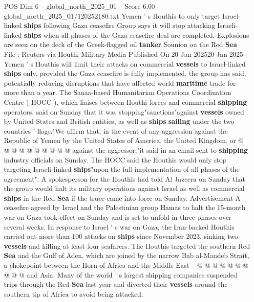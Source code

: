 \begin{textsample}{POS Dim 6 – global\_north\_2025\_01 – Score 6.00 – global\_north\_2025\_01/120252180.txt}  \label{ex:f6_pos_275}
Yemen ' s Houthis to only target Israel-linked \textbf{ships} following Gaza ceasefire Group says it will stop attacking Israeli-linked \textbf{ships} when all phases of the Gaza ceasefire deal are completed.
Explosions are seen on the deck of the Greek-flagged oil \textbf{tanker} Sounion on the Red \textbf{Sea} File : Reuters via Houthi Military Media Published On 20 Jan 202520 Jan 2025 Yemen ' s Houthis will limit their attacks on commercial \textbf{vessels} to Israel-linked \textbf{ships} only, provided the Gaza ceasefire is fully implemented, the group has said, potentially reducing disruptions that have affected world \textbf{maritime} trade for more than a year.
The Sanaa-based Humanitarian Operations Coordination Centre ( HOCC ), which liaises between Houthi forces and commercial \textbf{shipping} operators, said on Sunday that it was stopping"sanctions"against \textbf{vessels} owned by United States and British entities, as well as \textbf{ships} \textbf{sailing} under the two countries ' flags."We affirm that, in the event of any aggression against the Republic of Yemen by the United States of America, the United Kingdom, or @ @ @ @ @ @ @ @ @ @ against the aggressor,"it said in an email sent to \textbf{shipping} industry officials on Sunday.
The HOCC said the Houthis would only stop targeting Israeli-linked \textbf{ships}"upon the full implementation of all phases of the agreement".
A spokesperson for the Houthis had told Al Jazeera on Sunday that the group would halt its military operations against Israel as well as commercial \textbf{ships} in the Red \textbf{Sea} if the truce came into force on Sunday.
Advertisement A ceasefire agreed by Israel and the Palestinian group Hamas to halt the 15-month war on Gaza took effect on Sunday and is set to unfold in three phases over several weeks.
In response to Israel ' s war on Gaza, the Iran-backed Houthis carried out more than 100 attacks on \textbf{ships} since November 2023, sinking two \textbf{vessels} and killing at least four seafarers.
The Houthis targeted the southern Red \textbf{Sea} and the Gulf of Aden, which are joined by the narrow Bab al-Mandeb Strait, a chokepoint between the Horn of Africa and the Middle East -- @ @ @ @ @ @ @ @ @ @ and Asia.
Many of the world ' s largest shipping companies suspended trips through the Red \textbf{Sea} last year and diverted their \textbf{vessels} around the southern tip of Africa to avoid being attacked.

\end{textsample}
